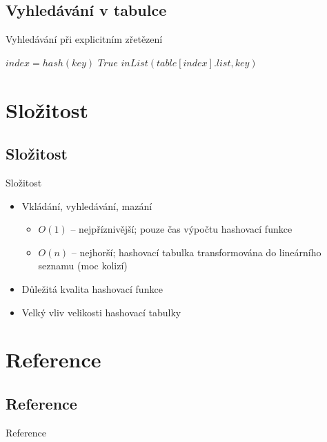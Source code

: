 \documentclass[14pt]{beamer}
\begin{document}
\subsection{Vyhledávání v tabulce}
\begin{frame}{Vyhledávání při explicitním zřetězení}
    \begin{algorithm}[H]
        \begin{algorithmic}[1]
            \STATE $index = hash(key)$
                \RETURN $True$
            \ELSE
                \RETURN $inList(table[index].list, key)$
            \ENDIF
        \end{algorithmic}
        \label{alg:seq}
    \end{algorithm}
\end{frame}
\section{Složitost}
\subsection{Složitost}
\begin{frame}{Složitost}
    \begin{itemize}
        \item Vkládání, vyhledávání, mazání
        \begin{itemize}
            \item $O(1)$ -- nejpříznivější; pouze čas výpočtu hashovací funkce
            \item $O(n)$ -- nejhorší; hashovací tabulka transformována do lineárního seznamu (moc kolizí)
        \end{itemize}
        \item Důležitá kvalita hashovací funkce
        \item Velký vliv velikosti hashovací tabulky
    \end{itemize}
\end{frame}
\section{Reference}
\subsection{Reference}
\begin{frame}{Reference}
\fontsize{9pt}{10}\selectfont
    
\end{frame}
\end{document}
